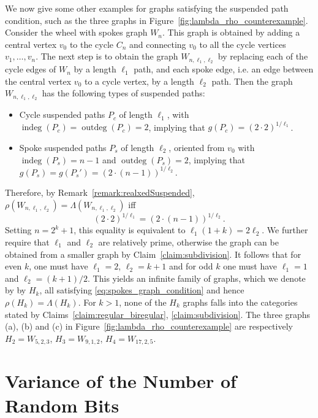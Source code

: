 \documentclass{article}
\DeclareMathOperator{\outdeg}{outdeg}
\DeclareMathOperator{\indeg}{indeg}
\begin{document}
We now give some other examples for graphs satisfying the suspended path condition, such as the three graphs in Figure~\ref{fig:lambda_rho_counterexample}.
    Consider the wheel with spokes graph $W_n$. 
    This graph is obtained by adding a central vertex $v_0$ to the cycle $C_n$ and connecting $v_0$ to all the cycle vertices $v_1,\ldots,v_n$.
    The next step is to obtain the graph $W_{n,\ell_1,\ell_2}$ by replacing each of the cycle edges of $W_n$ by a length $\ell_1$ path, and each spoke edge, i.e. an edge between the central vertex $v_0$ to a cycle vertex, by a length $\ell_2$ path. 
    Then the graph $W_{n,\ell_1,\ell_2}$ has the following types of suspended paths:
    \begin{itemize}
        \item Cycle suspended paths $P_c$ of length $\ell_1$, with $\indeg(P_c)=\outdeg(P_c)=2$, implying that $g(P_c) = (2 \cdot 2)^{1/\ell_1}$.
        \item Spoke suspended paths $P_s$ of length $\ell_2$, oriented from $v_0$ with $\indeg(P_s)=n-1$ and $\outdeg(P_s)=2$, implying that $g(P_s) = g(P_s') = (2 \cdot (n-1))^{1/\ell_2}$.
    \end{itemize}
    Therefore, by Remark~\ref{remark:realxedSuspended}, $\rho(W_{n,\ell_1,\ell_2}) = \Lambda(W_{n,\ell_1,\ell_2})$ iff
    \begin{equation}\label{eq:spokes_graph_condition}
        (2 \cdot 2)^{1/\ell_1} = (2 \cdot (n-1))^{1/\ell_2}.
    \end{equation}
    Setting $n=2^k+1$, this equality is equivalent to $\ell_1(1+k) = 2 \ell_2$.
    We further require that $\ell_1$ and $\ell_2$ are relatively prime, otherwise the graph can be obtained from  a smaller graph by Claim~\ref{claim:subdivision}.
    It follows that for even $k$, one must have $\ell_1 = 2$, $\ell_2 = k+1$ and for odd $k$ one must have $\ell_1 = 1$ and $\ell_2 = (k+1)/2$.
    This yields an infinite family of graphs, which we denote by by $H_k$, all satisfying \eqref{eq:spokes_graph_condition} and hence $\rho(H_k)=\Lambda(H_k)$.
    For $k>1$, none of the $H_k$ graphs falls into the categories stated by Claims~\ref{claim:regular_biregular}, \ref{claim:subdivision}.
    The three graphs (a), (b) and (c) in Figure~\ref{fig:lambda_rho_counterexample} are respectively 
    $H_2 = W_{5,2,3}$, $H_3 = W_{9,1,2}$, $H_4 = W_{17,2,5}$.             

\section{Variance of the Number of Random Bits}\label{sect:variance}
\end{document}
